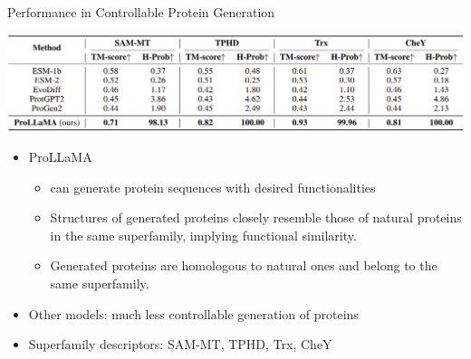 \begin{frame}{Performance in Controllable Protein Generation}%
	\begin{center}
		\includegraphics[scale=0.21]{tables/controlled_generation_comparison.png}
	\end{center}
	\vspace{-1em}
	\begin{itemize}
		\item ProLLaMA
		\begin{itemize}
			\item can generate protein sequences with desired functionalities
			\item Structures of generated proteins closely resemble those of natural proteins in the same superfamily, implying functional similarity.
			\item Generated proteins are homologous to natural ones and belong to the same superfamily.
		\end{itemize}
		\item Other models: much less controllable generation of proteins
		\item Superfamily descriptors: SAM-MT, TPHD, Trx, CheY
	\end{itemize}
\end{frame}